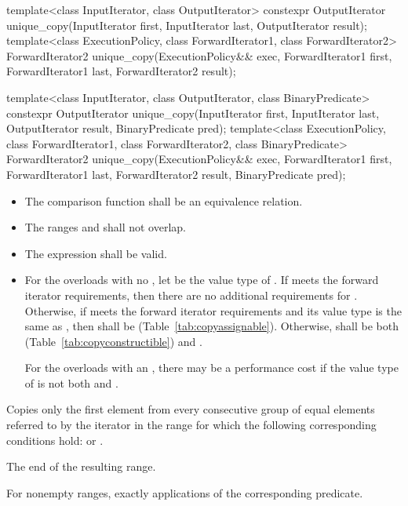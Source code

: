 %
\begin{itemdecl}
template<class InputIterator, class OutputIterator>
  constexpr OutputIterator
    unique_copy(InputIterator first, InputIterator last,
                OutputIterator result);
template<class ExecutionPolicy, class ForwardIterator1, class ForwardIterator2>
  ForwardIterator2
    unique_copy(ExecutionPolicy&& exec,
                ForwardIterator1 first, ForwardIterator1 last,
                ForwardIterator2 result);

template<class InputIterator, class OutputIterator,
         class BinaryPredicate>
  constexpr OutputIterator
    unique_copy(InputIterator first, InputIterator last,
                OutputIterator result, BinaryPredicate pred);
template<class ExecutionPolicy, class ForwardIterator1, class ForwardIterator2,
         class BinaryPredicate>
  ForwardIterator2
    unique_copy(ExecutionPolicy&& exec,
                ForwardIterator1 first, ForwardIterator1 last,
                ForwardIterator2 result, BinaryPredicate pred);
\end{itemdecl}


\begin{itemdescr}
\pnum
\requires
\begin{itemize}
\item
The comparison function shall be an equivalence relation.

\item
The ranges
and
shall not overlap.

\item
The expression
shall be valid.

\item
For the overloads with no ,
let  be the value type of .
If  meets the forward iterator requirements,
then there are no additional requirements for .
Otherwise, if  meets the forward iterator
requirements and its value type is the same as ,
then  shall be  (Table~\ref{tab:copyassignable}).
Otherwise,  shall be both
 (Table~\ref{tab:copyconstructible}) and .
\begin{note}
For the overloads with an , there may be a performance
cost if the value type of  is not both
 and .
\end{note}
\end{itemize}

\pnum
\effects
Copies only the first element from every consecutive group of equal elements referred to by
the iterator
in the range
for which the following corresponding conditions hold:
or
.

\pnum
\returns
The end of the resulting range.

\pnum
\complexity
For nonempty ranges, exactly
applications of the corresponding predicate.
\end{itemdescr}

